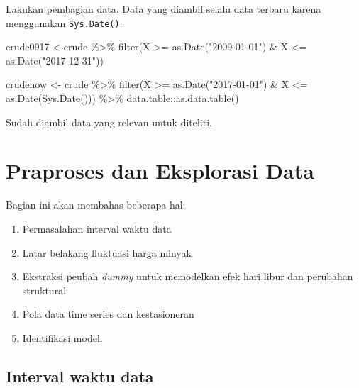 \documentclass[
]{book}
\newenvironment{Shaded}{\begin{snugshade}}{\end{snugshade}}
\newcommand{\FunctionTok}[1]{\textcolor[rgb]{0.00,0.00,0.00}{#1}}
\newcommand{\NormalTok}[1]{#1}
\newcommand{\OtherTok}[1]{\textcolor[rgb]{0.56,0.35,0.01}{#1}}
\newcommand{\SpecialCharTok}[1]{\textcolor[rgb]{0.00,0.00,0.00}{#1}}
\newcommand{\StringTok}[1]{\textcolor[rgb]{0.31,0.60,0.02}{#1}}
\providecommand{\tightlist}{%
  \setlength{\itemsep}{0pt}\setlength{\parskip}{0pt}}
\begin{document}
Lakukan pembagian data. Data yang diambil selalu data terbaru karena menggunakan \texttt{Sys.Date()}:

\begin{Shaded}
\begin{Highlighting}[]
\NormalTok{crude0917 }\OtherTok{\textless{}{-}}\NormalTok{crude }\SpecialCharTok{\%\textgreater{}\%} \FunctionTok{filter}\NormalTok{(X }\SpecialCharTok{\textgreater{}=} \FunctionTok{as.Date}\NormalTok{(}\StringTok{"2009{-}01{-}01"}\NormalTok{) }\SpecialCharTok{\&}\NormalTok{ X }\SpecialCharTok{\textless{}=} \FunctionTok{as.Date}\NormalTok{(}\StringTok{"2017{-}12{-}31"}\NormalTok{))}

\NormalTok{crudenow  }\OtherTok{\textless{}{-}}\NormalTok{ crude }\SpecialCharTok{\%\textgreater{}\%} \FunctionTok{filter}\NormalTok{(X }\SpecialCharTok{\textgreater{}=} \FunctionTok{as.Date}\NormalTok{(}\StringTok{"2017{-}01{-}01"}\NormalTok{) }\SpecialCharTok{\&}\NormalTok{ X }\SpecialCharTok{\textless{}=} \FunctionTok{as.Date}\NormalTok{(}\FunctionTok{Sys.Date}\NormalTok{())) }\SpecialCharTok{\%\textgreater{}\%}\NormalTok{ data.table}\SpecialCharTok{::}\FunctionTok{as.data.table}\NormalTok{()}
\end{Highlighting}
\end{Shaded}

Sudah diambil data yang relevan untuk diteliti.

\hypertarget{praproses-dan-eksplorasi-data}{%
\chapter{Praproses dan Eksplorasi Data}\label{praproses-dan-eksplorasi-data}}

Bagian ini akan membahas beberapa hal:

\begin{enumerate}
\def\labelenumi{\arabic{enumi}.}
\tightlist
\item
  Permasalahan interval waktu data
\item
  Latar belakang fluktuasi harga minyak
\item
  Ekstraksi peubah \emph{dummy} untuk memodelkan efek hari libur dan perubahan struktural
\item
  Pola data time series dan kestasioneran
\item
  Identifikasi model.
\end{enumerate}

\hypertarget{interval-waktu-data}{%
\section{Interval waktu data}\label{interval-waktu-data}}
\end{document}
